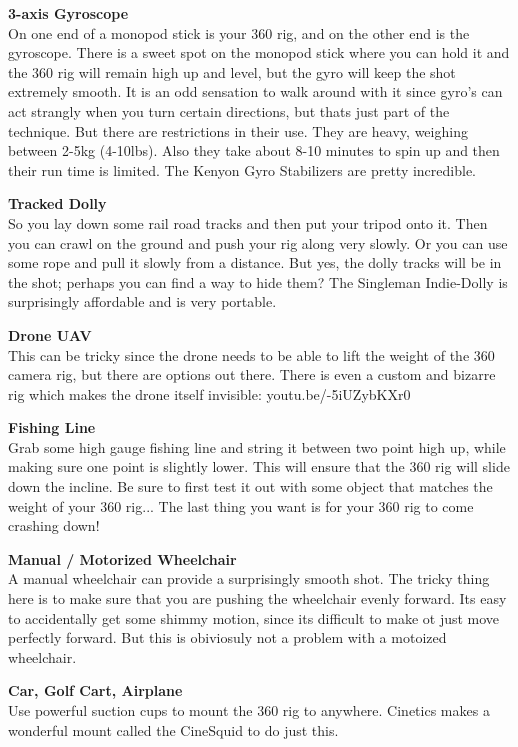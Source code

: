 \begin{fullwidth}
{\bf 3-axis Gyroscope}
\\
On one end of a monopod stick is your 360 rig, and on the other end is the gyroscope. There is a sweet spot on the monopod stick where you can hold it and the 360 rig will remain high up and level, but the gyro will keep the shot extremely smooth. It is an odd sensation to walk around with it since gyro's can act strangly when you turn certain directions, but thats just part of the technique. But there are restrictions in their use. They are heavy, weighing between 2-5kg (4-10lbs). Also they take about 8-10 minutes to spin up and then their run time is limited. The Kenyon Gyro Stabilizers are pretty incredible.

{\bf Tracked Dolly}
\\
So you lay down some rail road tracks and then put your tripod onto it. Then you can crawl on the ground and push your rig along very slowly. Or you can use some rope and pull it slowly from a distance. But yes, the dolly tracks will be in the shot; perhaps you can find a way to hide them? The Singleman Indie-Dolly is surprisingly affordable and is very portable. 

{\bf Drone UAV}
\\
This can be tricky since the drone needs to be able to lift the weight of the 360 camera rig, but there are options out there. There is even a custom and bizarre rig which makes the drone itself invisible: youtu.be/-5iUZybKXr0

{\bf Fishing Line}
\\
Grab some high gauge fishing line and string it between two point high up, while making sure one point is slightly lower. This will ensure that the 360 rig will slide down the incline. Be sure to first test it out with some object that matches the weight of your 360 rig... The last thing you want is for your 360 rig to come crashing down!

{\bf Manual / Motorized Wheelchair}
\\
A manual wheelchair can provide a surprisingly smooth shot. The tricky thing here is to make sure that you are pushing the wheelchair evenly forward. Its easy to accidentally get some shimmy motion, since its difficult to make ot just move perfectly forward. But this is obiviosuly not a problem with a motoized wheelchair. 

{\bf Car, Golf Cart, Airplane}
\\
Use powerful suction cups to mount the 360 rig to anywhere. Cinetics makes a wonderful mount called the CineSquid to do just this.





\clearpage
\end{fullwidth}
